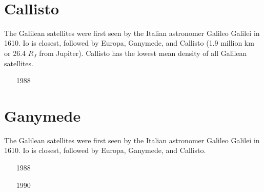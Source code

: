 \begin{small}
\begin{itemize}
\item[\twothousandeight] 
\item[\twothousandnine]
\item[\twothousandten]
\\ 
\item[\twothousandtwelve] 
\item[\twothousandthirteen] 
\item[\twothousandfourteen]
\item[\twothousandtwentytwo] 
\end{itemize}
\end{small}

\section{Callisto}

The Galilean satellites were first seen by the Italian astronomer Galileo Galilei in 1610. 
Io is closest, followed by Europa, Ganymede, and Callisto (1.9 million km or
26.4 $R_J$ from Jupiter). Callisto has the lowest mean density of all Galilean satellites.

\begin{small}
\begin{itemize}
\item[1988]
\item[\twothousandfour]
\item[\twothousandfive]
\item[\twothousandsix]
\end{itemize}
\end{small}

\section{Ganymede}

The Galilean satellites were first seen by the Italian astronomer Galileo Galilei in 1610. 
Io is closest, followed by Europa, Ganymede, and Callisto.

\begin{small}
\begin{itemize}
\item[1988]
 \\ 
\item[1990]
\item[\twothousandsix]
\item[\twothousandfourteen]
\end{itemize}
\end{small}


